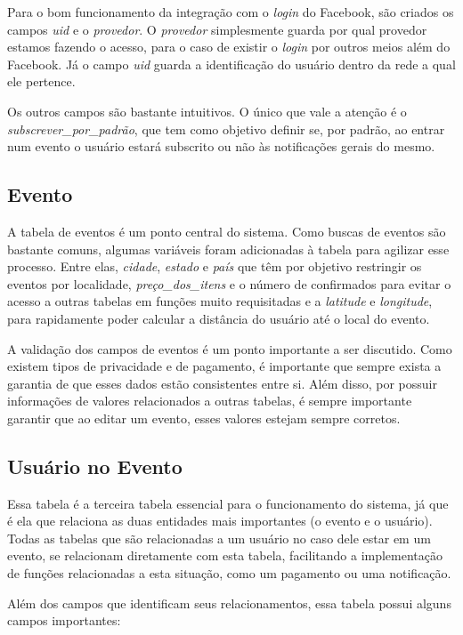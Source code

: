Para o bom funcionamento da integração com o \textit{login} do Facebook, são criados os campos \textit{uid} e o \textit{provedor}. O \textit{provedor} simplesmente guarda por qual provedor estamos fazendo o acesso, para o caso de existir o \textit{login} por outros meios além do Facebook. Já o campo \textit{uid} guarda a identificação do usuário dentro da rede a qual ele pertence.

Os outros campos são bastante intuitivos. O único que vale a atenção é o \textit{subscrever\_por\_padrão}, que tem como objetivo definir se, por padrão, ao entrar num evento o usuário estará subscrito ou não às notificações gerais do mesmo.

\subsection{Evento}

A tabela de eventos é um ponto central do sistema. Como buscas de eventos são bastante comuns, algumas variáveis foram adicionadas à tabela para agilizar esse processo. Entre elas, \textit{cidade}, \textit{estado} e \textit{país} que têm por objetivo restringir os eventos por localidade, \textit{preço\_dos\_itens} e o número de confirmados para evitar o acesso a outras tabelas em funções muito requisitadas e a \textit{latitude} e \textit{longitude}, para rapidamente poder calcular a distância do usuário até o local do evento.

A validação dos campos de eventos é um ponto importante a ser discutido. Como existem tipos de privacidade e de pagamento, é importante que sempre exista a garantia de que esses dados estão consistentes entre si. Além disso, por possuir informações de valores relacionados a outras tabelas, é sempre importante garantir que ao editar um evento, esses valores estejam sempre corretos.

\subsection{Usuário no Evento}

Essa tabela é a terceira tabela essencial para o funcionamento do sistema, já que é ela que relaciona as duas entidades mais importantes (o evento e o usuário). Todas as tabelas que são relacionadas a um usuário no caso dele estar em um evento, se relacionam diretamente com esta tabela, facilitando a implementação de funções relacionadas a esta situação, como um pagamento ou uma notificação.

Além dos campos que identificam seus relacionamentos, essa tabela possui alguns campos importantes:

